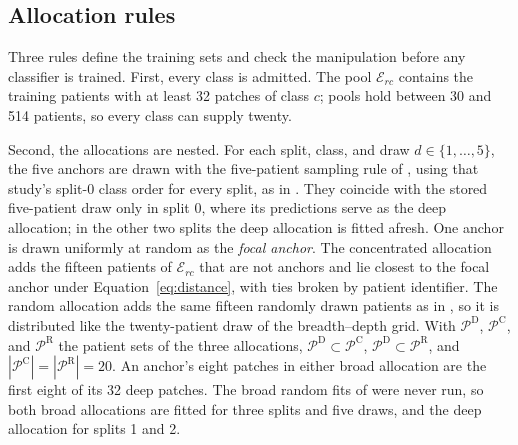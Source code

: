 \documentclass[11pt]{article}
\begin{document}
\subsection{Allocation rules}
\label{sec:allocation}
Three rules define the training sets and check the manipulation before any classifier is trained. First, every class is admitted. The pool $\mathcal E_{rc}$ contains the training patients with at least 32 patches of class $c$; pools hold between 30 and 514 patients, so every class can supply twenty.

Second, the allocations are nested. For each split, class, and draw $d\in\{1,\ldots,5\}$, the five anchors are drawn with the five-patient sampling rule of \citet{queisler2026effectiveSupport}, using that study's split-0 class order for every split, as in \citet{queisler2026patientCoverage}. They coincide with the stored five-patient draw only in split 0, where its predictions serve as the deep allocation; in the other two splits the deep allocation is fitted afresh. One anchor is drawn uniformly at random as the \emph{focal anchor}. The concentrated allocation adds the fifteen patients of $\mathcal E_{rc}$ that are not anchors and lie closest to the focal anchor under Equation~\eqref{eq:distance}, with ties broken by patient identifier. The random allocation adds the same fifteen randomly drawn patients as in \citet{queisler2026patientCoverage}, so it is distributed like the twenty-patient draw of the breadth--depth grid. With $\mathcal P^{\mathrm D}$, $\mathcal P^{\mathrm C}$, and $\mathcal P^{\mathrm R}$ the patient sets of the three allocations, $\mathcal P^{\mathrm D}\subset\mathcal P^{\mathrm C}$, $\mathcal P^{\mathrm D}\subset\mathcal P^{\mathrm R}$, and $|\mathcal P^{\mathrm C}|=|\mathcal P^{\mathrm R}|=20$. An anchor's eight patches in either broad allocation are the first eight of its 32 deep patches. The broad random fits of \citet{queisler2026patientCoverage} were never run, so both broad allocations are fitted for three splits and five draws, and the deep allocation for splits 1 and 2.
\end{document}
